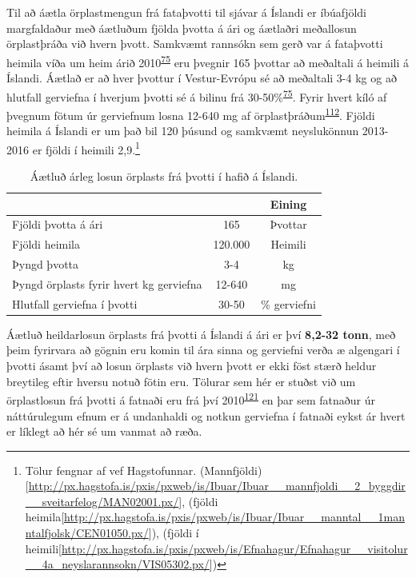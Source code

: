 \documentclass[icelandic,]{book}
\let\rmarkdownfootnote\footnote%
\def\footnote{\protect\rmarkdownfootnote}
\begin{document}
Til að áætla örplastmengun frá fataþvotti til sjávar á Íslandi er íbúafjöldi margfaldaður með áætluðum fjölda þvotta á ári og áætlaðri meðallosun örplastþráða við hvern þvott. Samkvæmt rannsókn sem gerð var á fataþvotti heimila víða um heim árið 2010\textsuperscript{\protect\hyperlink{ref-Pakula2010}{75}} eru þvegnir 165 þvottar að meðaltali á heimili á Íslandi. Áætlað er að hver þvottur í Vestur-Evrópu sé að meðaltali 3-4 kg og að hlutfall gerviefna í hverjum þvotti sé á bilinu frá 30-50\%\textsuperscript{\protect\hyperlink{ref-Pakula2010}{75}}. Fyrir hvert kíló af þvegnum fötum úr gerviefnum losna 12-640 mg af örplastþráðum\textsuperscript{\protect\hyperlink{ref-magnusson2016swedish}{112}}. Fjöldi heimila á Íslandi er um það bil 120 þúsund og samkvæmt neyslukönnun 2013-2016 er fjöldi í heimili 2,9.\footnote{Tölur fengnar af vef Hagstofunnar. (Mannfjöldi){[}\url{http://px.hagstofa.is/pxis/pxweb/is/Ibuar/Ibuar__mannfjoldi__2_byggdir__sveitarfelog/MAN02001.px/}{]}, (fjöldi heimila{[}\url{http://px.hagstofa.is/pxis/pxweb/is/Ibuar/Ibuar__manntal__1manntalfjolsk/CEN01050.px/}{]}), (fjöldi í heimili{[}\url{http://px.hagstofa.is/pxis/pxweb/is/Efnahagur/Efnahagur__visitolur__4a_neyslarannsokn/VIS05302.px/}{]})}

\begin{table}[t]

\caption{\label{tab:unnamed-chunk-13}Áætluð árleg losun örplasts frá þvotti í hafið á Íslandi.}
\centering
\begin{tabular}{lcc}
\toprule
  &  & Eining\\
\midrule
Fjöldi þvotta á ári & 165 & Þvottar\\
Fjöldi heimila & 120.000 & Heimili\\
Þyngd þvotta & 3-4 & kg\\
Þyngd örplasts fyrir hvert kg gerviefna & 12-640 & mg\\
Hlutfall gerviefna í þvotti & 30-50 & \% gerviefni\\
\bottomrule
\end{tabular}
\end{table}

Áætluð heildarlosun örplasts frá þvotti á Íslandi á ári er því \textbf{8,2-32 tonn}, með þeim fyrirvara að gögnin eru komin til ára sinna og gerviefni verða æ algengari í þvotti ásamt því að losun örplasts við hvern þvott er ekki föst stærð heldur breytileg eftir hversu notuð fötin eru. Tölurar sem hér er stuðst við um örplastlosun frá þvotti á fatnaði eru frá því 2010\textsuperscript{\protect\hyperlink{ref-pakula2010electricity}{121}} en þar sem fatnaður úr náttúrulegum efnum er á undanhaldi og notkun gerviefna í fatnaði eykst ár hvert er líklegt að hér sé um vanmat að ræða.
\end{document}
